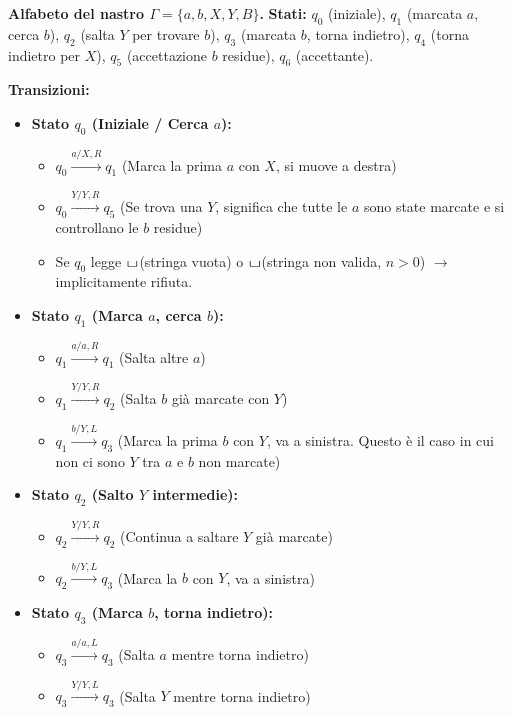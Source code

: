 \documentclass[a4paper]{article}
\theoremstyle{definition} %
\newcommand{\blankS}{\ensuremath{\raisebox{-0.15ex}{\scalebox{1.3}[0.7]{$\sqcup$}}}}
\begin{document}
\noindent \textbf{Alfabeto del nastro $\Gamma = \{a, b, X, Y, B\}$.}
\noindent \textbf{Stati:} $q_0$ (iniziale), $q_1$ (marcata $a$, cerca $b$), $q_2$ (salta $Y$ per trovare $b$), $q_3$ (marcata $b$, torna indietro), $q_4$ (torna indietro per $X$), $q_5$ (accettazione $b$ residue), $q_6$ (accettante).

\noindent \textbf{Transizioni:}
\begin{itemize}
    \item \textbf{Stato $q_0$ (Iniziale / Cerca $a$):}
        \begin{itemize}
            \item $q_0 \xrightarrow{a / X, R} q_1$ (Marca la prima $a$ con $X$, si muove a destra)
            \item $q_0 \xrightarrow{Y / Y, R} q_5$ (Se trova una $Y$, significa che tutte le $a$ sono state marcate e si controllano le $b$ residue)
            \item Se $q_0$ legge \blankS (stringa vuota) o \blankS (stringa non valida, $n > 0$) $\to$ implicitamente rifiuta.
        \end{itemize}
    \item \textbf{Stato $q_1$ (Marca $a$, cerca $b$):}
        \begin{itemize}
            \item $q_1 \xrightarrow{a / a, R} q_1$ (Salta altre $a$)
            \item $q_1 \xrightarrow{Y / Y, R} q_2$ (Salta $b$ già marcate con $Y$)
            \item $q_1 \xrightarrow{b / Y, L} q_3$ (Marca la prima $b$ con $Y$, va a sinistra. Questo è il caso in cui non ci sono $Y$ tra $a$ e $b$ non marcate)
        \end{itemize}
    \item \textbf{Stato $q_2$ (Salto $Y$ intermedie):}
        \begin{itemize}
            \item $q_2 \xrightarrow{Y / Y, R} q_2$ (Continua a saltare $Y$ già marcate)
            \item $q_2 \xrightarrow{b / Y, L} q_3$ (Marca la $b$ con $Y$, va a sinistra)
        \end{itemize}
    \item \textbf{Stato $q_3$ (Marca $b$, torna indietro):}
        \begin{itemize}
            \item $q_3 \xrightarrow{a / a, L} q_3$ (Salta $a$ mentre torna indietro)
            \item $q_3 \xrightarrow{Y / Y, L} q_3$ (Salta $Y$ mentre torna indietro)

\end{itemize}
\end{itemize}
\end{document}
